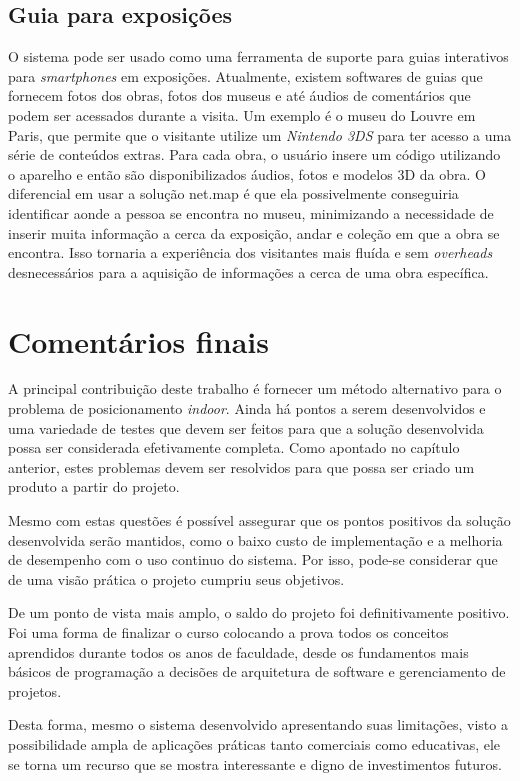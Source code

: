 \subsection{Guia para exposições}
O sistema pode ser usado como uma ferramenta de suporte para guias interativos para \textit{smartphones} em exposições. Atualmente, existem softwares de guias que fornecem fotos dos obras, fotos dos museus e até áudios de comentários que podem ser acessados durante a visita. Um exemplo é o museu do Louvre em Paris, que permite que o visitante utilize um \textit{Nintendo 3DS} para ter acesso a uma série de conteúdos extras. Para cada obra, o usuário insere um código utilizando o aparelho e então são disponibilizados áudios, fotos e modelos 3D da obra. O diferencial em usar a solução net.map é que ela possivelmente conseguiria identificar aonde a pessoa se encontra no museu, minimizando a necessidade de inserir muita informação a cerca da exposição, andar e coleção em que a obra se encontra. Isso tornaria a experiência dos visitantes mais fluída e sem \textit{overheads} desnecessários para a aquisição de informações a cerca de uma obra específica.

\section{Comentários finais}

A principal contribuição deste trabalho é fornecer um método alternativo para o problema de posicionamento \textit{indoor}. Ainda há pontos a serem desenvolvidos e uma variedade de testes que devem ser feitos para que a solução desenvolvida possa ser considerada efetivamente completa. Como apontado no capítulo anterior, estes problemas devem ser resolvidos para que possa ser criado um produto a partir do projeto.\par
Mesmo com estas questões é possível assegurar que os pontos positivos da solução desenvolvida serão mantidos, como o baixo custo de implementação e a melhoria de desempenho com o uso continuo do sistema. Por isso, pode-se considerar que de uma visão prática o projeto cumpriu seus objetivos.\par
De um ponto de vista mais amplo, o saldo do projeto foi definitivamente positivo. Foi uma forma de finalizar o curso colocando a prova todos os conceitos aprendidos durante todos os anos de faculdade, desde os fundamentos mais básicos de programação a decisões de arquitetura de software e gerenciamento de projetos.\par
Desta forma, mesmo o sistema desenvolvido apresentando suas limitações, visto a possibilidade ampla de aplicações práticas tanto comerciais como educativas, ele se torna um recurso que se mostra interessante e digno de investimentos futuros.
